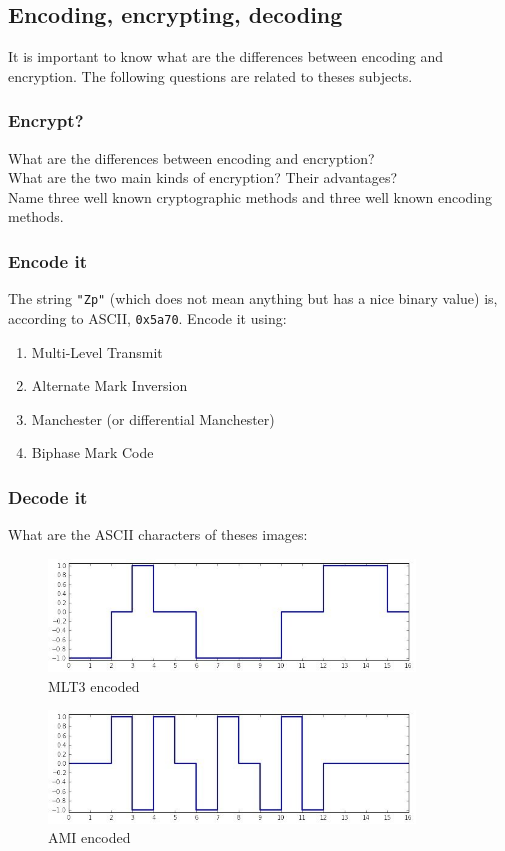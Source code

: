 \documentclass[11pt]{article}
\begin{document}
\subsection{Encoding, encrypting, decoding}
It is important to know what are the differences between encoding and encryption. The following questions are related to theses subjects.
\subsubsection{Encrypt?}
What are the differences between encoding and encryption?\\
What are the two main kinds of encryption? Their advantages?\\
Name three well known cryptographic methods and three well known encoding methods.

\subsubsection{Encode it}
The string \verb$"Zp"$ (which does not mean anything but has a nice binary value) is, according to ASCII, \verb$0x5a70$. Encode it using:
  \begin{enumerate}
    \item Multi-Level Transmit
    \item Alternate Mark Inversion
    \item Manchester (or differential Manchester)
    \item Biphase Mark Code
  \end{enumerate}

\subsubsection{Decode it}
What are the ASCII characters of theses images:
  \begin{figure}[h]
    \centering
    \includegraphics[height=3cm]{../slides/imgs/MLT3:).jpg}
    \caption{MLT3 encoded}
    \label{fig:mlt3}
  \end{figure}
  \begin{figure}[h]
    \centering
    \includegraphics[height=3cm]{../slides/imgs/AMI;p.jpg}
    \caption{AMI encoded}
    \label{fig:ami}
  \end{figure}
\end{document}
